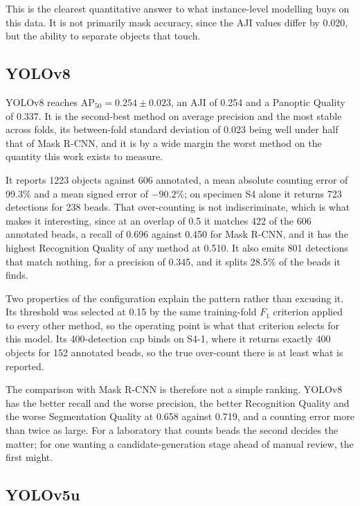 This is the clearest quantitative answer to what instance-level modelling buys on
this data. It is not primarily mask accuracy, since the AJI values differ by
0.020, but the ability to separate objects that touch.

\subsection{YOLOv8}
\label{sec:yolo_results}

YOLOv8 reaches $\mathrm{AP}_{50} = 0.254 \pm 0.023$, an AJI of 0.254 and a
Panoptic Quality of 0.337. It is the second-best method on average precision and
the most stable across folds, its between-fold standard deviation of 0.023 being
well under half that of Mask R-CNN, and it is by a wide margin the worst method on
the quantity this work exists to measure.

It reports 1223 objects against 606 annotated, a mean absolute counting error of
99.3\% and a mean signed error of $-90.2\%$; on specimen S4 alone it returns 723
detections for 238 beads. That over-counting is not indiscriminate, which is what
makes it interesting, since at an overlap of 0.5 it matches 422 of the 606
annotated beads, a recall of 0.696 against 0.450 for Mask R-CNN, and it has the
highest Recognition Quality of any method at 0.510. It also emits 801 detections
that match nothing, for a precision of 0.345, and it splits 28.5\% of the beads it
finds.

Two properties of the configuration explain the pattern rather than excusing it.
Its threshold was selected at 0.15 by the same training-fold $F_1$ criterion
applied to every other method, so the operating point is what that criterion
selects for this model. Its 400-detection cap binds on S4-1, where it returns
exactly 400 objects for 152 annotated beads, so the true over-count there is at
least what is reported.

The comparison with Mask R-CNN is therefore not a simple ranking. YOLOv8 has the
better recall and the worse precision, the better Recognition Quality and the
worse Segmentation Quality at 0.658 against 0.719, and a counting error more than
twice as large. For a laboratory that counts beads the second decides the
matter; for one wanting a candidate-generation stage ahead of manual review, the
first might.

\subsection{YOLOv5u}
\label{sec:yolov5_results}

